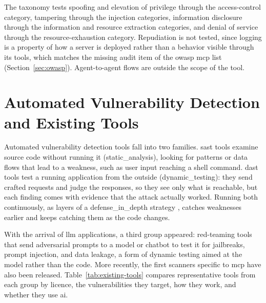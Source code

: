 The taxonomy tests spoofing and elevation of privilege through the access-control category, tampering through the injection categories, information disclosure through the information and resource extraction categories, and denial of service through the resource-exhaustion category. Repudiation is not tested, since logging is a property of how a server is deployed rather than a behavior visible through its tools, which matches the missing audit item of the \gls{owasp} \gls{mcp} list (Section~\ref{sec:owasp}). Agent-to-agent flows are outside the scope of the tool.

\section{Automated Vulnerability Detection and Existing Tools}
\label{sec:existing-tools}

Automated vulnerability detection tools fall into two families. \gls{sast} tools examine source code without running it (\gls{static_analysis}), looking for patterns or data flows that lead to a weakness, such as user input reaching a shell command. \gls{dast} tools test a running application from the outside (\gls{dynamic_testing}): they send crafted requests and judge the responses, so they see only what is reachable, but each finding comes with evidence that the attack actually worked. Running both continuously, as layers of a \gls{defense_in_depth} strategy \citep{nist2022ssdf}, catches weaknesses earlier and keeps catching them as the code changes.

With the arrival of \gls{llm} applications, a third group appeared: red-teaming tools that send adversarial prompts to a model or chatbot to test it for jailbreaks, prompt injection, and data leakage, a form of dynamic testing aimed at the model rather than the code. More recently, the first scanners specific to \gls{mcp} have also been released. Table~\ref{tab:existing-tools} compares representative tools from each group by licence, the vulnerabilities they target, how they work, and whether they use \gls{ai}.

